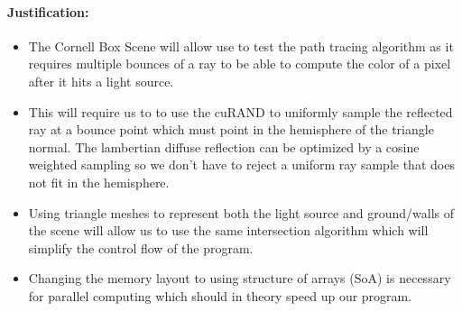 \documentclass[12pt]{article}
\begin{document}
\paragraph{Justification:}

\begin{itemize}
    \item The Cornell Box Scene will allow use to test the path tracing algorithm as it requires
        multiple bounces of a ray to be able to compute the color of a pixel after it hits a light
        source.
    \item This will require us to to use the cuRAND to uniformly sample the reflected
        ray at a bounce point which must point in the hemisphere of the triangle normal.
        The lambertian diffuse reflection can be optimized by a cosine weighted sampling 
        so we don't have to reject a uniform ray sample that does not fit in the hemisphere.
    \item Using triangle meshes to represent both the light source and ground/walls of the
        scene will allow us to use the same intersection algorithm which will simplify the
        control flow of the program.
    \item Changing the memory layout to using structure of arrays (SoA) is necessary for
        parallel computing which should in theory speed up our program.
\end{itemize}
\end{document}
